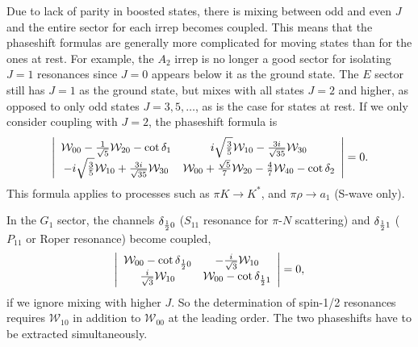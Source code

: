 \documentclass[aps,prd,reprint,showpacs,floatfix,longbibliography,,superscriptaddress]{revtex4-1}
\def\mw{\mathcal{W}}
\def\beq{\begin{equation}}
\def\eeq{\end{equation}}
\begin{document}
\begin{widetext}
Due to lack of parity in boosted states, there is mixing between odd and even $J$ and the entire sector for each irrep becomes coupled.
This means that the phaseshift formulas are generally more complicated for moving states than for the ones at rest.
For example, the $A_2$ irrep is no longer a good sector for isolating $J=1$ resonances since $J=0$ appears below it 
as the ground state. The $E$ sector still has $J=1$ as the ground state, but mixes with all states $J=2$ and higher, 
as opposed to only odd states $J=3, 5, \ldots$, as is the case for states at rest.
If we only consider coupling with $J=2$, the phaseshift formula is
%
\beq
\left |
\begin{array}{cc}       
 \mw_{00} - {1\over \sqrt{5}} \mw_{20}   - \cot\delta_{1} &   i \sqrt{\frac{3}{5}} \mw_{10}-\frac{3 i }{\sqrt{35}} \mw_{30}      \\
-i \sqrt{\frac{3}{5}} \mw_{10} + \frac{3 i }{\sqrt{35}} \mw_{30}          & \mw_{00}+\frac{\sqrt{5} }{7} \mw_{20}-\frac{4}{7} \mw_{40}   - \cot\delta_{2}   \\
\end{array}             
\right |                
=0.                     
\label{eq:detE1boost}
\eeq
%
This formula applies to processes such as $\pi K\rightarrow K^*$, and 
$\pi \rho\rightarrow a_1$ (S-wave only). 

In the $G_1$ sector, the channels $\delta_{{1\over 2}0}$ ($S_{11}$ resonance for $\pi$-$N$ scattering) 
and $\delta_{{1\over 2}1}$ ($P_{11}$ or Roper  resonance) become coupled,
\beq
\left |
\begin{array}{cc}       
\mw_{00} - \cot\delta_{{1\over 2}0} &  -\frac{i }{\sqrt{3}}    \mw_{10}     \\
 \frac{i }{\sqrt{3}}    \mw_{10}                & \mw_{00} - \cot\delta_{{1\over 2}1}   \\
\end{array}             
\right |                
=0,                     
\label{eq:detG1boost}
\eeq
if we ignore mixing with higher $J$.
So the determination of spin-1/2 resonances requires $\mw_{10}$ in addition to $\mw_{00}$ at the leading order.
The two phaseshifts have to be extracted simultaneously.


\end{widetext}
\end{document}
